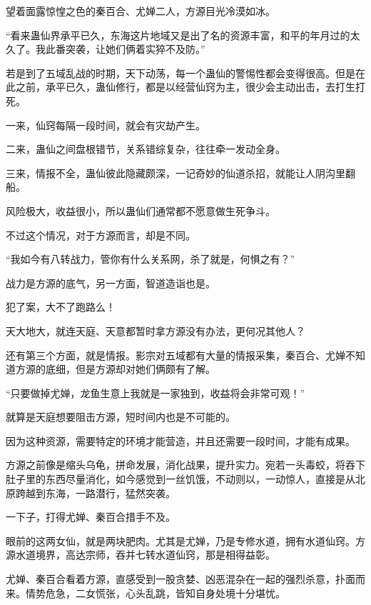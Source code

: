 
\begin{this_body}



望着面露惊惶之色的秦百合、尤婵二人，方源目光冷漠如冰。

“看来蛊仙界承平已久，东海这片地域又是出了名的资源丰富，和平的年月过的太久了。我此番突袭，让她们俩着实猝不及防。”

若是到了五域乱战的时期，天下动荡，每一个蛊仙的警惕性都会变得很高。但是在此之前，承平已久，蛊仙修行，都是以经营仙窍为主，很少会主动出击，去打生打死。

一来，仙窍每隔一段时间，就会有灾劫产生。

二来，蛊仙之间盘根错节，关系错综复杂，往往牵一发动全身。

三来，情报不全，蛊仙彼此隐藏颇深，一记奇妙的仙道杀招，就能让人阴沟里翻船。

风险极大，收益很小，所以蛊仙们通常都不愿意做生死争斗。

不过这个情况，对于方源而言，却是不同。

“我如今有八转战力，管你有什么关系网，杀了就是，何惧之有？”

战力是方源的底气，另一方面，智道造诣也是。

犯了案，大不了跑路么！

天大地大，就连天庭、天意都暂时拿方源没有办法，更何况其他人？

还有第三个方面，就是情报。影宗对五域都有大量的情报采集，秦百合、尤婵不知道方源的底细，但是方源却对她们俩颇有了解。

“只要做掉尤婵，龙鱼生意上我就是一家独到，收益将会非常可观！”

就算是天庭想要阻击方源，短时间内也是不可能的。

因为这种资源，需要特定的环境才能营造，并且还需要一段时间，才能有成果。

方源之前像是缩头乌龟，拼命发展，消化战果，提升实力。宛若一头毒蛟，将吞下肚子里的东西尽量消化，如今感觉到一丝饥饿，不动则以，一动惊人，直接是从北原跨越到东海，一路潜行，猛然突袭。

一下子，打得尤婵、秦百合措手不及。

眼前的这两女仙，就是两块肥肉。尤其是尤婵，乃是专修水道，拥有水道仙窍。方源水道境界，高达宗师，吞并七转水道仙窍，那是相得益彰。

尤婵、秦百合看着方源，直感受到一股贪婪、凶恶混杂在一起的强烈杀意，扑面而来。情势危急，二女慌张，心头乱跳，皆知自身处境十分堪忧。


\end{this_body}
